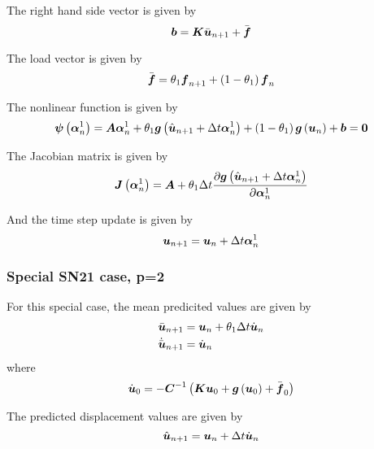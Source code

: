 The right hand side vector is given by
\begin{equation}
  \vectr{b}=\matr{K}\bar{\vectr{u}}_{n+1}+\bar{\vectr{f}}
\end{equation}

The load vector is given by
\begin{equation}
  \bar{\boldsymbol{f}}=\theta_{1}\boldsymbol{f}_{n+1}+\left( 1-\theta_{1} \right)\boldsymbol{f}_{n}
\end{equation}

The nonlinear function is given by
\begin{equation}
  \fnof{\vectr{\psi}}{\vectr{\alpha}^{1}_{n}}=\matr{A}\vectr{\alpha}^{1}_{n}+\theta_{1}\fnof{\vectr{g}}{\hat{\vectr{u}}_{n+1}+ 
    \Delta t\vectr{\alpha}^{1}_{n}}+\pbrac{1-\theta_{1}}\fnof{\vectr{g}}{\vectr{u}_{n}}+\vectr{b}=\vectr{0}
\end{equation}

The Jacobian matrix is given by
\begin{equation}
  \fnof{\matr{J}}{\vectr{\alpha}^{1}_{n}}=\matr{A}+\theta_{1}\Delta t
  \delby{\fnof{\vectr{g}}{\hat{\vectr{u}}_{n+1}+\Delta t\vectr{\alpha}^{1}_{n}}}{\vectr{\alpha}^{1}_{n}}
\end{equation}

And the time step update is given by
\begin{equation}
    \boldsymbol{u}_{n+1} = \boldsymbol{u}_{n}+\Delta t\boldsymbol{\alpha}^{1}_{n}
\end{equation}

\subsubsection{Special SN21 case, p=2}

For this special case, the mean predicited values are given by
\begin{equation}
  \begin{split}
    \bar{\boldsymbol{u}}_{n+1} &= \boldsymbol{u}_{n}+\theta_{1}\Delta t\dot{\boldsymbol{u}}_{n}\\
    \dot{\bar{\boldsymbol{u}}}_{n+1} &= \dot{\boldsymbol{u}}_{n}
  \end{split}
\end{equation}
where
\begin{equation}
  \dot{\vectr{u}}_{0}=-\inverse{\matr{C}}\pbrac{\matr{K}\vectr{u}_{0}+\fnof{\vectr{g}}{\vectr{u}_{0}}+\bar{\vectr{f}}_{0}}
\end{equation}

The predicted displacement values are given by
\begin{equation}
   \hat{\boldsymbol{u}}_{n+1} = \boldsymbol{u}_{n}+\Delta t\dot{\boldsymbol{u}}_{n}
\end{equation}

